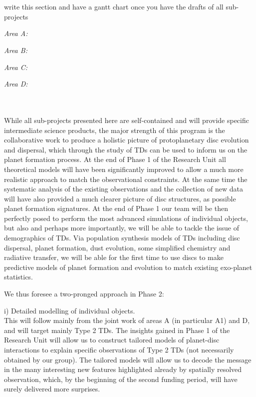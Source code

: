 \documentclass[12pt]{article}
\begin{document}
\mbox{}\vspace{1em}\\
\vspace{0.8em}\\

\noindent 

{\color{red} write this section and have a gantt chart once you have
  the drafts of all sub-projects} 

{\em Area A:} 

{\em Area B:}


{\em Area C:} 


{\em Area D:}





\mbox{}\vspace{1em}\\
\\
%
While all sub-projects presented here are self-contained and will
provide specific intermediate science products, the major strength of this program is the collaborative
work to produce a holistic picture of protoplanetary disc evolution
and dispersal, which through the study of TDs can be used
to inform us on the planet formation process. At the end of Phase 1 of
the Research Unit all theoretical models will have been significantly
improved to allow a much more realistic approach to match the
observational constraints. At the same time the systematic analysis of
the existing observations and the collection of new data will have also
provided a much clearer picture of disc structures, as possible planet
formation signatures. At the end of Phase 1 our team will be then
perfectly posed to perform the most advanced simulations of individual
objects, but also and perhaps more importantly, we will be able to
tackle the issue of demographics of TDs. Via population
synthesis models of TDs including disc dispersal, planet formation, dust
evolution, some simplified chemistry and radiative transfer, we will
be able for the first time to use discs to make predictive models of
planet formation and evolution to match existing exo-planet
statistics. 

We thus foresee a two-pronged approach in Phase 2: 

i) Detailed modelling of individual objects.\\
This will follow mainly from the joint work of areas A (in particular
A1) and D, and will target mainly Type 2 TDs. The insights gained in
Phase 1 of the Research Unit will allow us to construct tailored
models of planet-disc interactions to explain specific observations of
Type 2 TDs (not necessarily obtained by our group). The tailored
models will allow us to decode the message in the many interesting new
features highlighted already by spatially resolved observation, which,
by the beginning of the second funding period, will have surely
delivered more surprises.  
\end{document}
